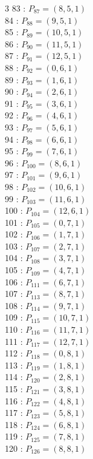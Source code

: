\documentclass{article}
\begin{document}
{\begin{multicols}{3}
83 : $P_{87}=( 8, 5, 1 )$\\
84 : $P_{88}=( 9, 5, 1 )$\\
85 : $P_{89}=( 10, 5, 1 )$\\
86 : $P_{90}=( 11, 5, 1 )$\\
87 : $P_{91}=( 12, 5, 1 )$\\
88 : $P_{92}=( 0, 6, 1 )$\\
89 : $P_{93}=( 1, 6, 1 )$\\
90 : $P_{94}=( 2, 6, 1 )$\\
91 : $P_{95}=( 3, 6, 1 )$\\
92 : $P_{96}=( 4, 6, 1 )$\\
93 : $P_{97}=( 5, 6, 1 )$\\
94 : $P_{98}=( 6, 6, 1 )$\\
95 : $P_{99}=( 7, 6, 1 )$\\
96 : $P_{100}=( 8, 6, 1 )$\\
97 : $P_{101}=( 9, 6, 1 )$\\
98 : $P_{102}=( 10, 6, 1 )$\\
99 : $P_{103}=( 11, 6, 1 )$\\
100 : $P_{104}=( 12, 6, 1 )$\\
101 : $P_{105}=( 0, 7, 1 )$\\
102 : $P_{106}=( 1, 7, 1 )$\\
103 : $P_{107}=( 2, 7, 1 )$\\
104 : $P_{108}=( 3, 7, 1 )$\\
105 : $P_{109}=( 4, 7, 1 )$\\
106 : $P_{111}=( 6, 7, 1 )$\\
107 : $P_{113}=( 8, 7, 1 )$\\
108 : $P_{114}=( 9, 7, 1 )$\\
109 : $P_{115}=( 10, 7, 1 )$\\
110 : $P_{116}=( 11, 7, 1 )$\\
111 : $P_{117}=( 12, 7, 1 )$\\
112 : $P_{118}=( 0, 8, 1 )$\\
113 : $P_{119}=( 1, 8, 1 )$\\
114 : $P_{120}=( 2, 8, 1 )$\\
115 : $P_{121}=( 3, 8, 1 )$\\
116 : $P_{122}=( 4, 8, 1 )$\\
117 : $P_{123}=( 5, 8, 1 )$\\
118 : $P_{124}=( 6, 8, 1 )$\\
119 : $P_{125}=( 7, 8, 1 )$\\
120 : $P_{126}=( 8, 8, 1 )$\\

\end{multicols}}
\end{document}

